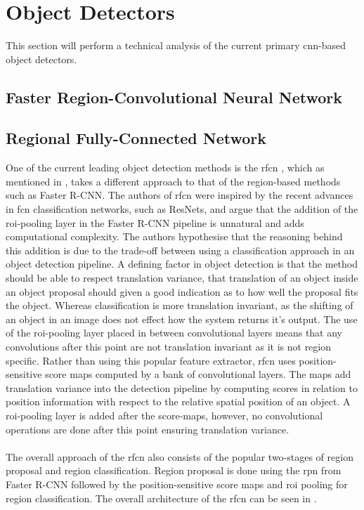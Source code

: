 \section{Object Detectors}
This section will perform a technical analysis of the current primary \gls{cnn}-based object detectors.

\subsection{Faster Region-Convolutional Neural Network}



\subsection{Regional Fully-Connected Network}
One of the current leading object detection methods is the \gls{rfcn} \cite{rfcn}, which as mentioned in , takes a different approach to that of the region-based methods such as Faster R-CNN. The authors of \gls{rfcn} were inspired by the recent advances in \gls{fcn} classification networks, such as ResNets, and argue that the addition of the \gls{roi}-pooling layer in the Faster R-CNN pipeline is unnatural and adds computational complexity. The authors hypothesise that the reasoning behind this addition is due to the trade-off between using a classification approach in an object detection pipeline. A defining factor in object detection is that the method should be able to respect translation variance, that translation of an object inside an object proposal should given a good indication as to how well the proposal fits the object. Whereas classification is more translation invariant, as the shifting of an object in an image does not effect how the system returns it's output. The use of the \gls{roi}-pooling layer placed in between convolutional layers means that any convolutions after this point are not translation invariant as it is not region specific. Rather than using this popular feature extractor, \gls{rfcn} uses position-sensitive score maps computed by a bank of convolutional layers. The maps add translation variance into the detection pipeline by computing scores in relation to position information with respect to the relative spatial position of an object. A \gls{roi}-pooling layer is added after the score-maps, however, no convolutional operations are done after this point ensuring translation variance.
\\\\
The overall approach of the \gls{rfcn} also consists of the popular two-stages of region proposal and region classification. Region proposal is done using the \gls{rpn} from Faster R-CNN followed by the position-sensitive score maps and \gls{roi} pooling for region classification. The overall architecture of the \gls{rfcn} can be seen in .


